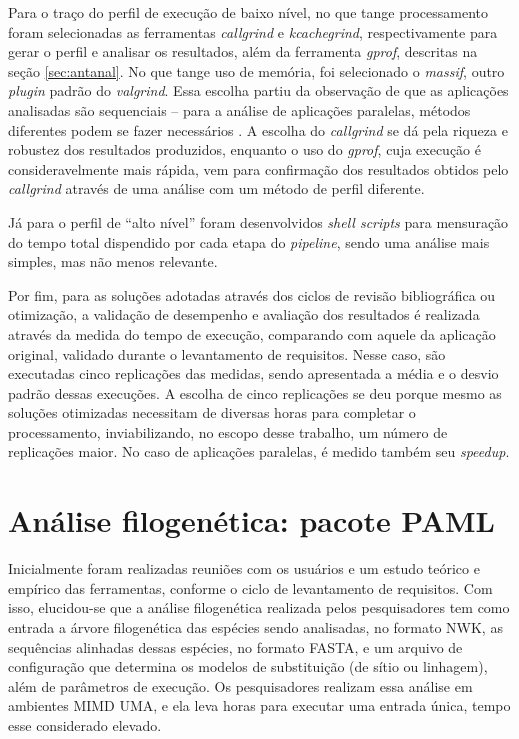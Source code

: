 \documentclass[cic,tc]{iiufrgs}
\begin{document}
Para o traço do perfil de execução de baixo nível, no que tange processamento
foram selecionadas as ferramentas \textit{callgrind} e \textit{kcachegrind}, respectivamente para
gerar o perfil e analisar os resultados, além da ferramenta \textit{gprof}, descritas na seção
\ref{sec:antanal}. No que tange uso de memória, foi selecionado o
\textit{massif}, outro \textit{plugin} padrão do \textit{valgrind}. Essa escolha partiu da
observação de que as aplicações analisadas são sequenciais -- para a análise de
aplicações paralelas, métodos diferentes podem se fazer necessários
\cite{weidendorfer2008sequential}. A escolha do \textit{callgrind} se dá pela riqueza e
robustez dos resultados produzidos, enquanto o uso do \textit{gprof}, cuja execução é
consideravelmente mais rápida, vem para confirmação dos resultados obtidos pelo
\textit{callgrind} através de uma análise com um método de perfil diferente.

Já para o perfil de ``alto nível'' foram desenvolvidos \textit{shell scripts}
para mensuração do tempo total dispendido por cada etapa do \textit{pipeline},
sendo uma análise mais simples, mas não menos relevante.

Por fim, para as soluções adotadas através dos ciclos de revisão bibliográfica
ou otimização, a validação de desempenho e avaliação dos resultados é realizada
através da medida do tempo de execução, comparando com aquele da aplicação
original, validado durante o levantamento de requisitos. Nesse caso, são
executadas cinco replicações das medidas, sendo apresentada a média e o desvio
padrão dessas execuções. A escolha de cinco replicações se deu porque mesmo as
soluções otimizadas necessitam de diversas horas para completar o
processamento, inviabilizando, no escopo desse trabalho, um número de
replicações maior. No caso de aplicações paralelas, é medido também seu
\textit{speedup}. 



\section{Análise filogenética: pacote PAML}
\label{sec:filomp}

Inicialmente foram realizadas reuniões com os usuários e um estudo teórico e
empírico das ferramentas, conforme o ciclo de levantamento de requisitos. Com
isso, elucidou-se que a análise filogenética realizada pelos pesquisadores tem
como entrada a árvore filogenética das espécies sendo analisadas, no formato
NWK, as sequências alinhadas dessas espécies, no formato FASTA, e um arquivo de
configuração que determina os modelos de substituição (de sítio ou linhagem),
além de parâmetros de execução. Os pesquisadores realizam essa análise em
ambientes MIMD UMA, e ela leva horas para executar uma entrada única,
tempo esse considerado elevado.
\end{document}
